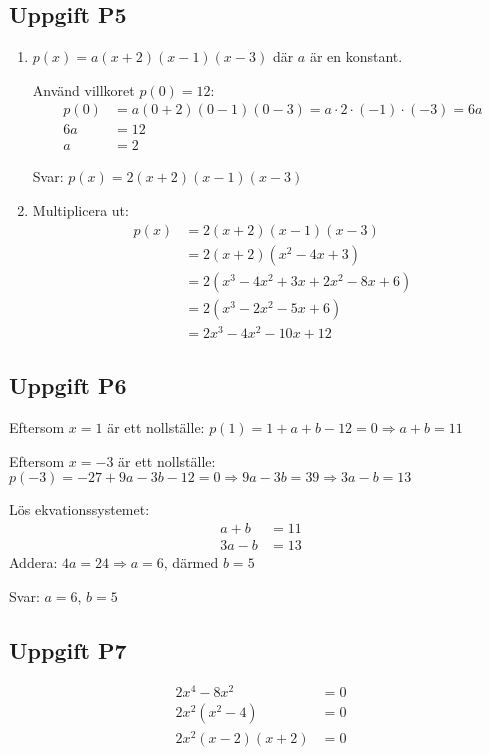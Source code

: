 \documentclass[12pt]{article}
\begin{document}
\subsection*{Uppgift P5}
\begin{enumerate}[label=\alph*)]
    \item $p(x) = a(x + 2)(x - 1)(x - 3)$ där $a$ är en konstant.
    
    Använd villkoret $p(0) = 12$:
    \begin{align*}
    p(0) &= a(0 + 2)(0 - 1)(0 - 3) = a \cdot 2 \cdot (-1) \cdot (-3) = 6a \\
    6a &= 12 \\
    a &= 2
    \end{align*}
    
    Svar: $p(x) = 2(x + 2)(x - 1)(x - 3)$
    
    \item Multiplicera ut:
    \begin{align*}
    p(x) &= 2(x + 2)(x - 1)(x - 3) \\
    &= 2(x + 2)(x^2 - 4x + 3) \\
    &= 2(x^3 - 4x^2 + 3x + 2x^2 - 8x + 6) \\
    &= 2(x^3 - 2x^2 - 5x + 6) \\
    &= 2x^3 - 4x^2 - 10x + 12
    \end{align*}
\end{enumerate}

\subsection*{Uppgift P6}
Eftersom $x = 1$ är ett nollställe: $p(1) = 1 + a + b - 12 = 0 \Rightarrow a + b = 11$

Eftersom $x = -3$ är ett nollställe: $p(-3) = -27 + 9a - 3b - 12 = 0 \Rightarrow 9a - 3b = 39 \Rightarrow 3a - b = 13$

Lös ekvationssystemet:
\begin{align*}
a + b &= 11 \\
3a - b &= 13
\end{align*}
Addera: $4a = 24 \Rightarrow a = 6$, därmed $b = 5$

Svar: $a = 6$, $b = 5$

\subsection*{Uppgift P7}
\begin{align*}
2x^4 - 8x^2 &= 0 \\
2x^2(x^2 - 4) &= 0 \\
2x^2(x - 2)(x + 2) &= 0
\end{align*}
\end{document}
